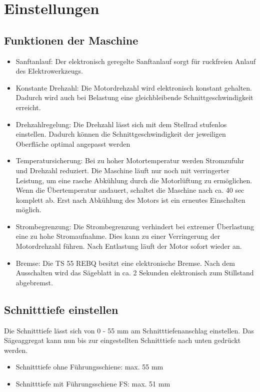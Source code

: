 \documentclass{\basedir/fablab-document}
\begin{document}
\section{Einstellungen}
\subsection{Funktionen der Maschine}
\begin{itemize}
\item Sanftanlauf: Der elektronisch geregelte Sanftanlauf sorgt für ruckfreien Anlauf des Elektrowerkzeugs.
\item Konstante Drehzahl: Die Motordrehzahl wird elektronisch konstant gehalten. Dadurch wird auch bei Belastung eine gleichbleibende Schnittgeschwindigkeit erreicht.
\item Drehzahlregelung: Die Drehzahl lässt sich mit dem Stellrad stufenlos einstellen. Dadurch können die Schnittgeschwindigkeit der jeweiligen Oberfläche optimal angepasst werden 
\item Temperatursicherung: Bei zu hoher Motortemperatur werden Stromzufuhr und Drehzahl reduziert. Die Maschine läuft nur noch mit verringerter Leistung, um eine rasche Abkühlung durch die Motorlüftung zu ermöglichen. Wenn die Übertemperatur andauert, schaltet die Maschine nach ca. 40 sec komplett ab. Erst nach Abkühlung des Motors ist ein erneutes Einschalten möglich.
\item Strombegrenzung: Die Strombegrenzung verhindert bei extremer Überlastung eine zu hohe Stromaufnahme. Dies kann zu einer Verringerung der Motordrehzahl führen. Nach Entlastung läuft der Motor sofort wieder an.
\item Bremse: Die TS 55 REBQ besitzt eine elektronische Bremse. Nach dem Ausschalten wird das Sägeblatt in ca. 2 Sekunden elektronisch zum Stillstand abgebremst.
\end{itemize}

\subsection{Schnitttiefe einstellen}
Die Schnitttiefe lässt sich von 0 - 55 mm am Schnitttiefenanschlag einstellen. Das Sägeaggregat kann nun bis zur eingestellten Schnitttiefe nach unten gedrückt werden. 
\begin{itemize}
\item Schnitttiefe ohne Führungsschiene: max. 55 mm
\item Schnitttiefe mit Führungsschiene FS: max. 51 mm
\end{itemize}
\end{document}
